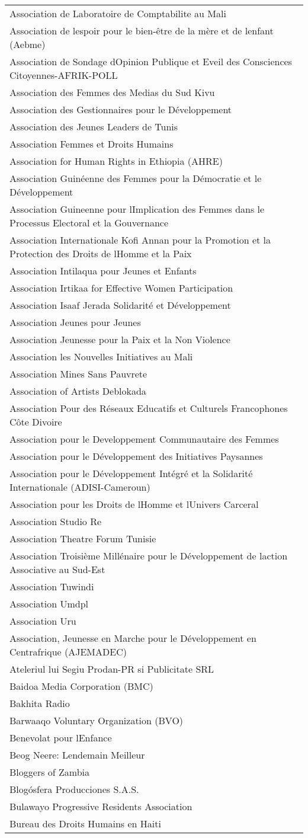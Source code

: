 \begin{longtable}[]{@{}l@{}}
Association de Laboratoire de Comptabilite au Mali\tabularnewline
Association de lespoir pour le bien-être de la mère et de lenfant
(Aebme)\tabularnewline
Association de Sondage dOpinion Publique et Eveil des Consciences
Citoyennes-AFRIK-POLL\tabularnewline
Association des Femmes des Medias du Sud Kivu\tabularnewline
Association des Gestionnaires pour le Développement\tabularnewline
Association des Jeunes Leaders de Tunis\tabularnewline
Association Femmes et Droits Humains\tabularnewline
Association for Human Rights in Ethiopia (AHRE)\tabularnewline
Association Guinéenne des Femmes pour la Démocratie et le
Développement\tabularnewline
Association Guineenne pour lImplication des Femmes dans le Processus
Electoral et la Gouvernance\tabularnewline
Association Internationale Kofi Annan pour la Promotion et la Protection
des Droits de lHomme et la Paix\tabularnewline
Association Intilaqua pour Jeunes et Enfants\tabularnewline
Association Irtikaa for Effective Women Participation\tabularnewline
Association Isaaf Jerada Solidarité et Développement\tabularnewline
Association Jeunes pour Jeunes\tabularnewline
Association Jeunesse pour la Paix et la Non Violence\tabularnewline
Association les Nouvelles Initiatives au Mali\tabularnewline
Association Mines Sans Pauvrete\tabularnewline
Association of Artists Deblokada\tabularnewline
Association Pour des Réseaux Educatifs et Culturels Francophones Côte
Divoire\tabularnewline
Association pour le Developpement Communautaire des
Femmes\tabularnewline
Association pour le Développement des Initiatives
Paysannes\tabularnewline
Association pour le Développement Intégré et la Solidarité
Internationale (ADISI-Cameroun)\tabularnewline
Association pour les Droits de lHomme et lUnivers
Carceral\tabularnewline
Association Studio Re\tabularnewline
Association Theatre Forum Tunisie\tabularnewline
Association Troisième Millénaire pour le Développement de laction
Associative au Sud-Est\tabularnewline
Association Tuwindi\tabularnewline
Association Umdpl\tabularnewline
Association Uru\tabularnewline
Association, Jeunesse en Marche pour le Développement en Centrafrique
(AJEMADEC)\tabularnewline
Ateleriul lui Segiu Prodan-PR si Publicitate SRL\tabularnewline
Baidoa Media Corporation (BMC)\tabularnewline
Bakhita Radio\tabularnewline
Barwaaqo Voluntary Organization (BVO)\tabularnewline
Benevolat pour lEnfance\tabularnewline
Beog Neere: Lendemain Meilleur\tabularnewline
Bloggers of Zambia\tabularnewline
Blogósfera Producciones S.A.S.\tabularnewline
Bulawayo Progressive Residents Association\tabularnewline
Bureau des Droits Humains en Haiti\tabularnewline

\end{longtable}

